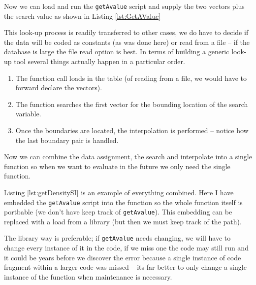 Now we can load and run the \texttt{getAvalue} script and supply the two vectors plus the search value as shown in Listing \ref{lst:GetAValue}

This look-up process is readily transferred to other cases, we do have to decide if the data will be coded as constants (as was done here) or read from a file -- if the database is large the file read option is best.  In terms of building a generic look-up tool several things actually happen in a particular order.

\begin{enumerate}
\item The function call loads in the table (of reading from a file, we would have to forward declare the vectors).
\item The function searches the first vector for the bounding location of the search variable.
\item Once the boundaries are located, the interpolation is performed -- notice how the last boundary pair is handled.
\end{enumerate}

Now we can combine the data assignment, the search and interpolate into a single function so when we want to evaluate in the future we only need the single function.

Listing \ref{lst:getDensitySI} is an example of everything combined.   Here I have embedded the \texttt{getAvalue} script into the function so the whole function itself is portbable (we don't have keep track of \texttt{getAvalue}).  This embedding can be replaced with a load from a library (but then we must keep track of the path).  

The library way is preferable; if \texttt{getAvalue} needs changing, we will have to change every instance of it in the code, if we miss one the code may still run and it could be years before we discover the error because a single instance of code fragment within a larger code was missed -- its far better to only change a single instance of the function when maintenance is necessary.

